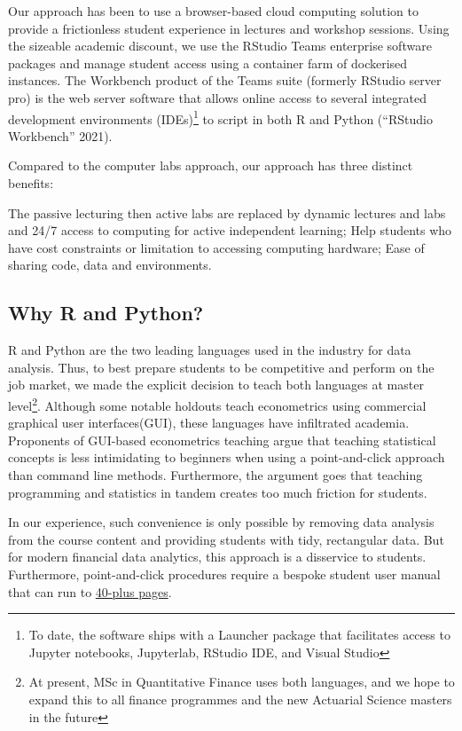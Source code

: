 \documentclass{article}
\begin{document}
Our approach has been to use a browser-based cloud computing solution to
provide a frictionless student experience in lectures and workshop
sessions. Using the sizeable academic discount, we use the RStudio Teams
enterprise software packages and manage student access using a container
farm of dockerised instances. The Workbench product of the Teams suite
(formerly RStudio server pro) is the web server software that allows
online access to several integrated development environments
(IDEs)\footnote{To date, the software ships with a Launcher package that
  facilitates access to Jupyter notebooks, Jupyterlab, RStudio IDE, and
  Visual Studio} to script in both R and Python ({``{RStudio}
Workbench''} 2021).

Compared to the computer labs approach, our approach has three distinct
benefits:

The passive lecturing then active labs are replaced by dynamic lectures
and labs and 24/7 access to computing for active independent learning;
Help students who have cost constraints or limitation to accessing
computing hardware; Ease of sharing code, data and environments.

\hypertarget{why-r-and-python}{%
\subsection{Why R and Python?}\label{why-r-and-python}}

R and Python are the two leading languages used in the industry for data
analysis. Thus, to best prepare students to be competitive and perform
on the job market, we made the explicit decision to teach both languages
at master level\footnote{At present, MSc in Quantitative Finance uses
  both languages, and we hope to expand this to all finance programmes
  and the new Actuarial Science masters in the future}. Although some
notable holdouts teach econometrics using commercial graphical user
interfaces(GUI), these languages have infiltrated academia. Proponents
of GUI-based econometrics teaching argue that teaching statistical
concepts is less intimidating to beginners when using a point-and-click
approach than command line methods. Furthermore, the argument goes that
teaching programming and statistics in tandem creates too much friction
for students.

In our experience, such convenience is only possible by removing data
analysis from the course content and providing students with tidy,
rectangular data. But for modern financial data analytics, this approach
is a disservice to students. Furthermore, point-and-click procedures
require a bespoke student user manual that can run to
\href{https://github.com/barryquinn1/FMLmaterial/blob/27d8094fee39fa0284d3a0bfc10e38dcd3bebcac/Introducing\%20Stata.pdf}{40-plus
pages}.
\end{document}
